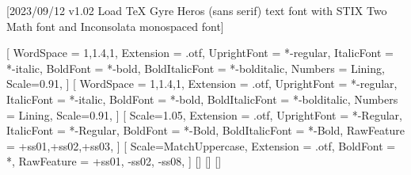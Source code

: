 
[2023/09/12 v1.02 Load TeX Gyre Heros (sans serif) text font with
STIX Two Math font and Inconsolata monospaced font]

%
%
\ifpdftex
{}
\RequirePackage[T1]{fontenc}
\RequirePackage{bm}
\else
{}
%
\RequirePackage[warnings-off={mathtools-colon,mathtools-overbracket}]{unicode-math}

\setmainfont{texgyreheros}[%
  WordSpace = {1,1.4,1},
  Extension = .otf,
  UprightFont = *-regular,
  ItalicFont = *-italic,
  BoldFont = *-bold,
  BoldItalicFont = *-bolditalic,
  Numbers = Lining,
  Scale=0.91,
]
\setsansfont{texgyreheros}[%
  WordSpace = {1,1.4,1},
  Extension = .otf,
  UprightFont = *-regular,
  ItalicFont = *-italic,
  BoldFont = *-bold,
  BoldItalicFont = *-bolditalic,
  Numbers = Lining,
  Scale=0.91,
]
\setmonofont{Inconsolatazi4}[%
  Scale=1.05,
  Extension = .otf,
  UprightFont = *-Regular,
  ItalicFont = *-Regular,%
  BoldFont = *-Bold,
  BoldItalicFont = *-Bold,%
  RawFeature = {+ss01,+ss02,+ss03},
]
[%
  Scale=MatchUppercase,
  Extension = .otf,
  BoldFont = *,%
  RawFeature = {+ss01, -ss02, -ss08},
]
%
\setmathfontface{}[]%
\setmathfontface{}[]
\setmathfontface{}[]%
%
\newcommand*{\FRAC}[1]{{\addfontfeature{Fractions=On}#1}}%
\fi
